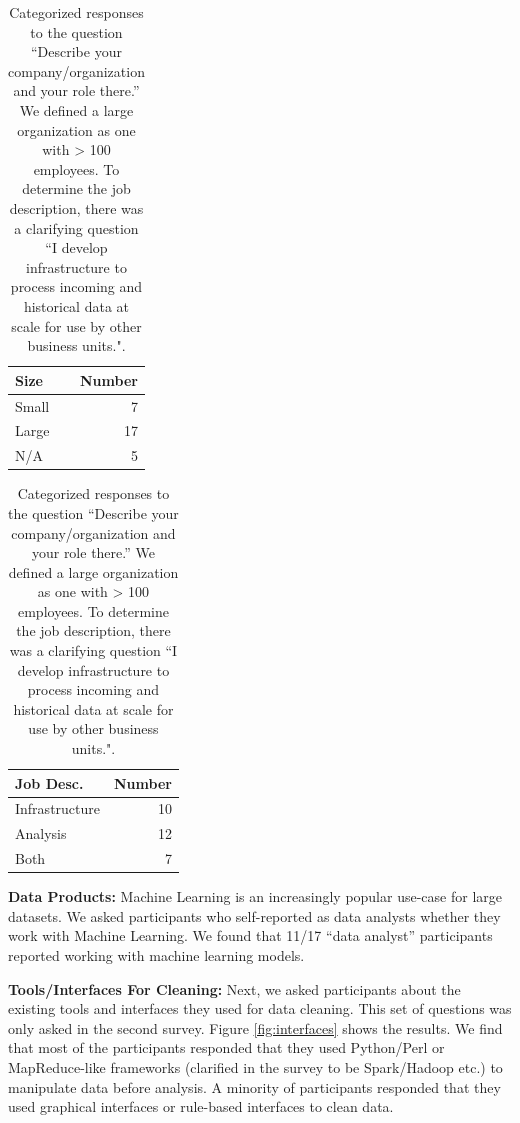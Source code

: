 \begin{table}[t]
\centering
\begin{tabular}{|l|r|}
\hline
Size                               & Number \\
\hline
Small    & 7      \\
\hline
Large & 17     \\
\hline
N/A                                & 5\\  \hline  
\end{tabular}
\quad
\begin{tabular}{|l|r|}
\hline
Job Desc.                              & Number \\
\hline
Infrastructure    & 10      \\
\hline
Analysis & 12     \\
\hline
Both                                & 7\\  \hline  
\end{tabular}

\caption{Categorized responses to the question ``Describe your company/organization and your role there.'' We defined a large organization as one with > 100 employees. To determine the job description, there was a clarifying question ``I develop infrastructure to process incoming and historical data at scale for use by other business units.". \label{tab:jobs}}
\end{table}

\vspace{0.5em}
\noindent\textbf{Data Products: } Machine Learning is an increasingly popular use-case for large datasets. We asked participants who self-reported as data analysts whether they work with Machine Learning. We found that 11/17 ``data analyst'' participants reported working with machine learning models.

\vspace{0.5em}
\noindent\textbf{Tools/Interfaces For Cleaning: } Next, we asked participants about the existing tools and interfaces they used for data cleaning. This set of questions was only asked in the second survey. Figure \ref{fig:interfaces} shows the results. We find that most of the participants responded that they used Python/Perl or MapReduce-like frameworks (clarified in the survey to be Spark/Hadoop etc.) to manipulate data before analysis. A minority of participants responded that they used graphical interfaces or rule-based interfaces to clean data.


